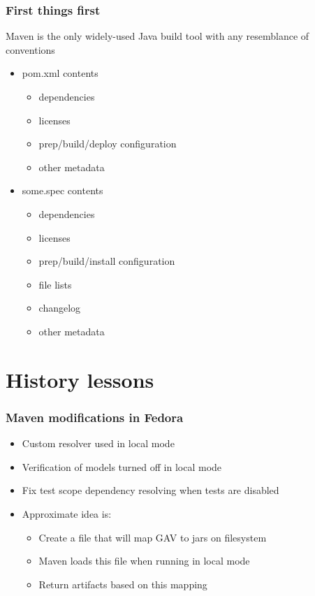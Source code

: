 \documentclass[pdftex,unicode,xcolor=table]{beamer}
\begin{document}
\begin{frame}
  \frametitle{First things first}
Maven is the only widely-used Java build tool with any resemblance of
      conventions
  \begin{itemize}
  \item pom.xml contents
    \begin{itemize}
    \item dependencies
    \item licenses
    \item prep/build/deploy configuration
    \item other metadata
    \end{itemize}
  \item some.spec contents
    \begin{itemize}
    \item dependencies
    \item licenses
    \item prep/build/install configuration
    \item file lists
    \item changelog
    \item other metadata
    \end{itemize}
  \end{itemize}
\end{frame}

\section{History lessons}
\begin{frame}
\frametitle{Maven modifications in Fedora}
\begin{itemize}
\item Custom resolver used in local mode
\item Verification of models turned off in local mode
\item Fix test scope dependency resolving when tests are disabled
\item Approximate idea is:
  \begin{itemize}
  \item Create a file that will map GAV to jars on filesystem
  \item Maven loads this file when running in local mode
  \item Return artifacts based on this mapping
  \end{itemize}
\end{itemize}
\end{frame}
\end{document}
